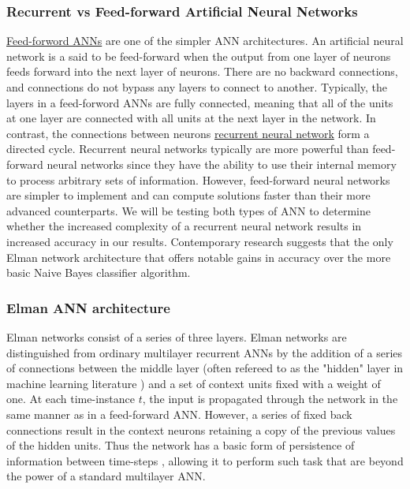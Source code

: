 \documentclass{article}
\begin{document}
\subsubsection{Recurrent vs Feed-forward Artificial Neural Networks}
\underline{Feed-forword ANNs} are one of the simpler ANN architectures. An artificial neural network is a said to be feed-forward when the output from one layer of neurons feeds forward into the next layer of neurons. There are no backward connections, and connections do not bypass any layers to connect to another. Typically, the layers in a feed-forword ANNs are fully connected, meaning that all of the units at one layer are connected with all units at the next layer in the network. In contrast, the connections between neurons \underline{recurrent neural network}  form a directed cycle. Recurrent neural networks typically are more powerful than feed-forward neural networks since they have the ability to use their internal memory to process arbitrary sets of information. However, feed-forward neural networks are simpler to implement and can compute solutions faster than their more advanced counterparts. We will be testing both types of ANN to determine whether the increased complexity of a recurrent neural network results in increased accuracy in our results.  Contemporary research suggests that the only Elman network architecture \citep{Smith_grammarinference} that offers notable gains in accuracy over the more basic Naive Bayes classifier algorithm.
\subsubsection{Elman ANN architecture}
Elman networks consist of a series of three layers. Elman networks are distinguished from ordinary multilayer recurrent ANNs by the addition of a series of connections between the middle layer (often refereed to as the "hidden" layer in machine learning literature \citep{neuralnets}) and a set of context units fixed with a weight of one. At each time-instance $t$, the input is propagated through the network in the same manner as in a feed-forward ANN. However, a series of fixed back connections result in the context neurons retaining a copy of the previous values of the hidden units. Thus the network has a basic form of persistence of information between time-steps \citep{Smola08introductionto}, allowing it to perform such task that are beyond the power of a standard multilayer ANN.  
\end{document}

